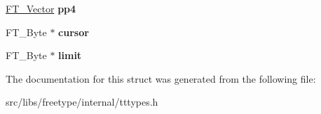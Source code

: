 \begin{DoxyCompactItemize}
\item 
\hypertarget{struct_t_t___loader_rec___a0608203207c3fc735046b8baef4b9201}{
\hyperlink{struct_f_t___vector__}{FT\_\-Vector} {\bfseries pp4}}
\label{struct_t_t___loader_rec___a0608203207c3fc735046b8baef4b9201}

\item 
\hypertarget{struct_t_t___loader_rec___a6769a96f37ca22801f6199937cbe9ca7}{
FT\_\-Byte $\ast$ {\bfseries cursor}}
\label{struct_t_t___loader_rec___a6769a96f37ca22801f6199937cbe9ca7}

\item 
\hypertarget{struct_t_t___loader_rec___a1b07761e8ea436c38b4c42117a00a0ff}{
FT\_\-Byte $\ast$ {\bfseries limit}}
\label{struct_t_t___loader_rec___a1b07761e8ea436c38b4c42117a00a0ff}

\end{DoxyCompactItemize}


The documentation for this struct was generated from the following file:\begin{DoxyCompactItemize}
\item 
src/libs/freetype/internal/tttypes.h\end{DoxyCompactItemize}
